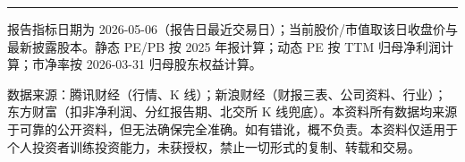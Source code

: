 \documentclass[fontset=none,10pt]{ctexart}
\begin{document}
\vspace{1.5mm}\hrule\vspace{1mm}
{\fontsize{5}{6}\selectfont
\noindent\begin{minipage}[t]{0.46\textwidth}报告指标日期为 2026-05-06（报告日最近交易日）；当前股价/市值取该日收盘价与最新披露股本。静态 PE/PB 按 2025 年报计算；动态 PE 按 TTM 归母净利润计算；市净率按 2026-03-31 归母股东权益计算。\end{minipage}\hfill
\begin{minipage}[t]{0.52\textwidth}数据来源：腾讯财经（行情、K 线）；新浪财经（财报三表、公司资料、行业）；东方财富（扣非净利润、分红报告期、北交所 K 线兜底）。本资料所有数据均来源于可靠的公开资料，但无法确保完全准确。如有错讹，概不负责。本资料仅适用于个人投资者训练投资能力，未获授权，禁止一切形式的复制、转载和交易。\end{minipage}
}
\end{document}
